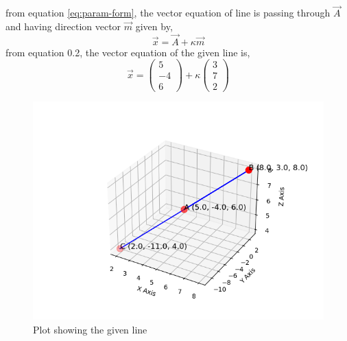 \documentclass[journal]{IEEEtran}
\begin{document}
from equation \eqref{eq:param-form}, the vector equation of line is passing through $\vec{A}$ and having direction vector $\vec{m}$ given by,\\
\begin{equation}
    \vec{x}=\vec{A}+\kappa\vec{m}
\end{equation}
from  equation 0.2, the vector equation of the given line is,
\begin{equation*}
    \vec{x}=\begin{pmatrix}
        5\\
        -4\\
        6
    \end{pmatrix}+\kappa\begin{pmatrix}
        3\\
        7\\
        2
    \end{pmatrix}
\end{equation*}

 \begin{figure}[h!]
   \centering
   \includegraphics[width=0.7\linewidth]{figs/figure1.png}
   \caption{Plot showing the given line}
   \label{stemplot}
\end{figure}
\end{document}
